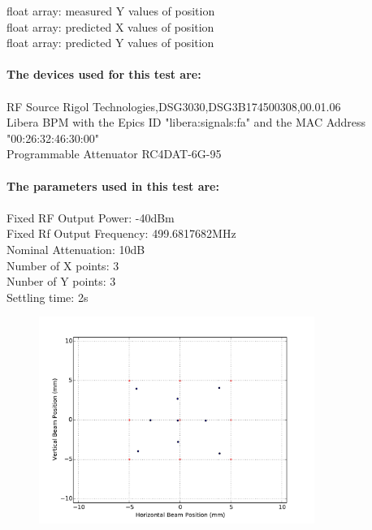 \documentclass[a4paper, 11pt]{article}%
\begin{document}
        float array: measured Y values of position\\
        float array: predicted X values of position\\
        float array: predicted Y values of position\\~\\
\textbf{The devices used for this test are:}\\\\%
RF Source Rigol Technologies,DSG3030,DSG3B174500308,00.01.06\\%
Libera BPM with the Epics ID "libera:signals:fa" and the MAC Address "00:26:32:46:30:00"\\%
Programmable Attenuator RC4DAT-6G-95\\%
\\%
\textbf{The parameters used in this test are:}\\\\%
Fixed RF Output Power: -40dBm\\%
Fixed Rf Output Frequency: 499.6817682MHz\\%
Nominal Attenuation: 10dB\\%
Number of X points: 3\\%
Nunber of Y points: 3\\%
Settling time: 2s\\

%


\begin{figure}[htbp]%
\centering%
\includegraphics[width=0.8\textwidth]{./Results/Beam_position_equidistant_grid_raster_scan_test}%
\caption{}%
\end{figure}

%
\clearpage%
\end{document}
